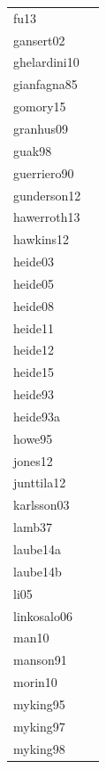 \documentclass[11pt]{article}
\begin{document}
\begin{footnotesize}
\begin{longtable}{p{}p{}}
  fu13 & \citep{Fu:2013aa} \\ 
  gansert02 & \citep{Gansert:2002aa} \\ 
  ghelardini10 & \citep{Ghelardini:2010aa} \\ 
  gianfagna85 & \citep{Gianfagna:1985aa} \\ 
  gomory15 & \citep{Gomory:2015aa} \\ 
  granhus09 & \citep{Granhus:2009aa} \\ 
  guak98 & \citep{Guak:1998aa} \\ 
  guerriero90 & \citep{guerriero:1990} \\ 
  gunderson12 & \citep{Gunderson:2012aa} \\ 
  hawerroth13 & \citep{Hawerroth:2013aa} \\ 
  hawkins12 & \citep{Hawkins:2012} \\ 
  heide03 & \citep{Heide:2003aa} \\ 
  heide05 & \citep{Heide:2005aa} \\ 
  heide08 & \citep{Heide:2008aa} \\ 
  heide11 & \citep{Heide:2011aa} \\ 
  heide12 & \citep{Heide:2012aa} \\ 
  heide15 & \citep{Heide:2015aa} \\ 
  heide93 & \citep{Heide:1993} \\ 
  heide93a & \citep{Heide:1993a} \\ 
  howe95 & \citep{Howe:1995aa} \\ 
  jones12 & \citep{Jones:2012} \\ 
  junttila12 & \citep{Junttila:2012aa} \\ 
  karlsson03 & \citep{Karlsson:2003aa} \\ 
  lamb37 & \citep{Lamb:1948aa} \\ 
  laube14a & \citep{Laube:2014a} \\ 
  laube14b & \citep{Laube:2014b} \\ 
  li05 & \citep{Li:2005aa} \\ 
  linkosalo06 & \citep{Linkosalo:2006aa} \\ 
  man10 & \citep{Man:2010aa} \\ 
  manson91 & \citep{Manson:1991aa} \\ 
  morin10 & \citep{Morin:2010aa} \\ 
  myking95 & \citep{Myking:1995} \\ 
  myking97 & \citep{Myking:1997aa} \\ 
  myking98 & \citep{Myking:1998aa} \\ 

\end{longtable}
\end{footnotesize}
\end{document}
